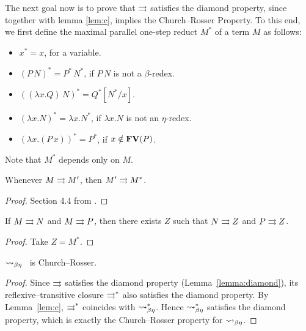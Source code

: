 The next goal now is to prove that $\mathrel{\rightrightarrows}$ satisfies the diamond property, since together with lemma \ref{lem:c}, implies the Church--Rosser Property. To this end, we first define the maximal parallel one-step reduct $M^*$ of a term $M$ as follows:
\begin{itemize}
  \item $x^* = x$, for a variable.
  \item $(P\,N)^* = P^*\,N^*$, if $P\,N$ is not a $\beta$-redex.
  \item $((\lambda x.Q)\,N)^* = Q^*[N^*/x]$.
  \item $(\lambda x.N)^* = \lambda x.N^*$, if $\lambda x.N$ is not an $\eta$-redex.
  \item $(\lambda x.(P\,x))^* = P^*$, if $x \notin \mathbf{FV}(P)$.
\end{itemize}
  
\noindent Note that $M^*$ depends only on $M$.

\begin{lemma}
\label{lemma:maximal-parallel}
Whenever $M \mathrel{\rightrightarrows} M'$, then $M' \mathrel{\rightrightarrows} M^*$.
\end{lemma}

\begin{proof}
  Section 4.4 from \cite{selinger2008:lambdanotes}.
\end{proof}


\begin{lemma}
\label{lemma:diamond}
If $M \mathrel{\rightrightarrows} N$ and $M \mathrel{\rightrightarrows} P$, then there exists $Z$ such that $N \mathrel{\rightrightarrows} Z$ and $P \mathrel{\rightrightarrows} Z$.
\end{lemma}

\begin{proof}
Take $Z = M^*$.
\end{proof}

\begin{theorem}
  $\mathrel{\leadsto}_{\beta\eta}$ \ is Church--Rosser.
\end{theorem}

\begin{proof}
  Since $\mathrel{\rightrightarrows}$ satisfies the diamond property (Lemma~\ref{lemma:diamond}),
  its reflexive--transitive closure $\mathrel{\rightrightarrows}^*$ also satisfies the diamond property.
  By Lemma~\ref{lem:c}, $\mathrel{\rightrightarrows}^*$ coincides with $\mathrel{\leadsto}^*_{\beta\eta}$.
  Hence $\mathrel{\leadsto}^*_{\beta\eta}$ satisfies the diamond property,
  which is exactly the Church--Rosser property for $\mathrel{\leadsto}_{\beta\eta}$.
\end{proof}















